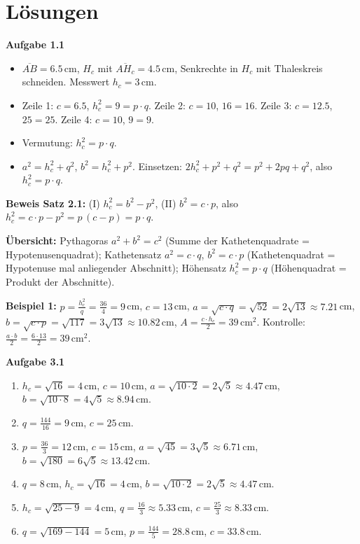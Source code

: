 \documentclass[11pt,oneside]{article}
\begin{document}
\newpage
\section*{Lösungen}
\textbf{Aufgabe 1.1}
\begin{itemize}[itemsep=0pt]
	\item[a)--b)] $\overline{AB}=6.5$\,cm, $H_c$ mit $\overline{AH_c}=4.5$\,cm, Senkrechte in $H_c$ mit Thaleskreis schneiden. Messwert $h_c=3$\,cm.
	\item[c)] Zeile 1: $c=6.5$, $h_c^2=9=p\cdot q$. Zeile 2: $c=10$, $16=16$. Zeile 3: $c=12.5$, $25=25$. Zeile 4: $c=10$, $9=9$.
	\item[d)] Vermutung: $h_c^2=p\cdot q$.
	\item[e)--f)] $a^2=h_c^2+q^2$, $b^2=h_c^2+p^2$. Einsetzen: $2h_c^2+p^2+q^2=p^2+2pq+q^2$, also $h_c^2=p\cdot q$.
\end{itemize}

\textbf{Beweis Satz 2.1:} (I) $h_c^2=b^2-p^2$, (II) $b^2=c\cdot p$, also $h_c^2=c\cdot p-p^2=p\,(c-p)=p\cdot q$.

\textbf{Übersicht:} Pythagoras $a^2+b^2=c^2$ (Summe der Kathetenquadrate = Hypotenusenquadrat); Kathetensatz $a^2=c\cdot q$, $b^2=c\cdot p$ (Kathetenquadrat = Hypotenuse mal anliegender Abschnitt); Höhensatz $h_c^2=p\cdot q$ (Höhenquadrat = Produkt der Abschnitte).

\textbf{Beispiel 1:} $p=\frac{h_c^2}{q}=\frac{36}{4}=9$\,cm, $c=13$\,cm, $a=\sqrt{c\cdot q}=\sqrt{52}=2\sqrt{13}\approx 7.21$\,cm, $b=\sqrt{c\cdot p}=\sqrt{117}=3\sqrt{13}\approx 10.82$\,cm, $A=\frac{c\cdot h_c}{2}=39$\,cm$^2$. Kontrolle: $\frac{a\cdot b}{2}=\frac{6\cdot 13}{2}=39$\,cm$^2$.

\textbf{Aufgabe 3.1}
\begin{enumerate}[label=\alph*), itemsep=0pt]
	\item $h_c=\sqrt{16}=4$\,cm, $c=10$\,cm, $a=\sqrt{10\cdot 2}=2\sqrt5\approx 4.47$\,cm, $b=\sqrt{10\cdot 8}=4\sqrt5\approx 8.94$\,cm.
	\item $q=\frac{144}{16}=9$\,cm, $c=25$\,cm.
	\item $p=\frac{36}{3}=12$\,cm, $c=15$\,cm, $a=\sqrt{45}=3\sqrt5\approx 6.71$\,cm, $b=\sqrt{180}=6\sqrt5\approx 13.42$\,cm.
	\item $q=8$\,cm, $h_c=\sqrt{16}=4$\,cm, $b=\sqrt{10\cdot 2}=2\sqrt5\approx 4.47$\,cm.
	\item $h_c=\sqrt{25-9}=4$\,cm, $q=\frac{16}{3}\approx 5.33$\,cm, $c=\frac{25}{3}\approx 8.33$\,cm.
	\item $q=\sqrt{169-144}=5$\,cm, $p=\frac{144}{5}=28.8$\,cm, $c=33.8$\,cm.
\end{enumerate}
\end{document}
